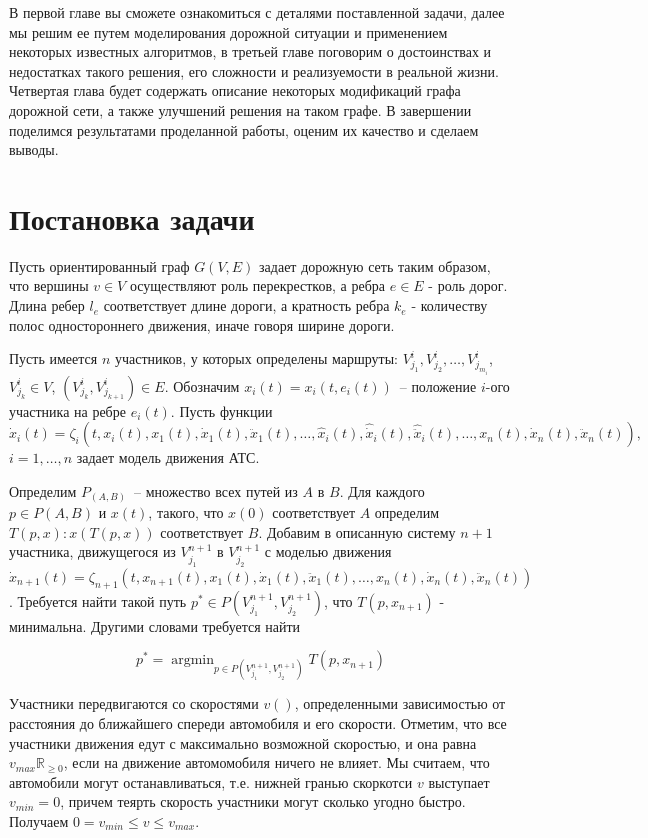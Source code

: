 \documentclass[12pt, a4paper]{article}
\DeclareMathOperator*{\argmin}{argmin}
\begin{document}
В первой главе вы сможете ознакомиться с деталями поставленной задачи, далее мы решим ее путем моделирования дорожной ситуации и применением некоторых известных алгоритмов, в третьей главе поговорим о достоинствах и недостатках такого решения, его сложности и реализуемости в реальной жизни. Четвертая глава будет содержать описание некоторых модификаций графа дорожной сети, а также улучшений решения на таком графе. В завершении поделимся результатами проделанной работы, оценим их качество и сделаем выводы.


\newpage
\section*{Постановка задачи}

Пусть ориентированный граф $ G (V, E)$ задает дорожную сеть таким образом, что вершины $ v \in V$ осуществляют роль перекрестков, а ребра $e \in E$ - роль дорог. Длина ребер $l_e$ соответствует длине дороги, а кратность ребра $ k_e $ - количеству полос одностороннего движения, иначе говоря ширине дороги. 


Пусть имеется $n$ участников, у которых определены маршруты: $V^i_{j_1}, V^i_{j_2}, \dots, V^i_{j_{m_i}}$,  $V^i_{j_k} \in V$, $\left( V^i_{j_k}, V^i_{j_{k+1}} \right) \in E$. Обозначим $x_i(t) = x_i(t, e_i(t))$~-- положение $i$-ого участника на ребре $e_i(t)$. Пусть функции $ \dot{x}_i(t) = \zeta_i(t, x_i(t), x_1(t), \dot{x}_1(t), \ddot{x}_1(t), \dots, \hat{x}_i(t), \hat{\dot{x}}_i(t), \hat{\ddot{x}}_i(t), \dots,  x_n(t), \dot{x}_n(t), \ddot{x}_n(t)),$ $i = 1, \dots, n$ задает модель движения АТС. 

Определим $P_(A,B)$~-- множество всех путей из $A$ в $B$. Для каждого $p \in P(A, B)$ и $x(t)$, такого, что $x(0)$ соответствует $A$ определим $T(p, x): x(T(p, x))$ соответствует $B$.
Добавим в описанную систему $n+1$ участника, движущегося из $V^{n+1}_{j_1}$ в $V^{n+1}_{j_2}$ с моделью движения $ \dot{x}_{n+1}(t) = \zeta_{n+1}(t, x_{n+1}(t), x_1(t), \dot{x}_1(t), \ddot{x}_1(t), \dots,  x_n(t), \dot{x}_n(t), \ddot{x}_n(t))$. Требуется найти такой путь $p^* \in P(V^{n+1}_{j_1}, V^{n+1}_{j_2})$, что $T(p, x_{n+1})$ - минимальна. Другими словами требуется найти

$$p^* = \argmin_{p \in P(V^{n+1}_{j_1}, V^{n+1}_{j_2})} T(p, x_{n+1})$$

Участники передвигаются со скоростями $v()$, определенными зависимостью от расстояния до ближайшего спереди автомобиля и его скорости. Отметим, что все участники движения едут с максимально возможной скоростью, и она равна $ v_{max} \mathbb {R}_{\geq 0}$, если на движение автомомобиля ничего не влияет. Мы считаем, что автомобили могут останавливаться, т.е. нижней гранью скоркотси $ v $ выступает $v_{min} = 0$, причем теярть скорость участники могут сколько угодно быстро. Получаем $ 0 = v_{min} \leq v \leq v_{max} $.
\end{document}
